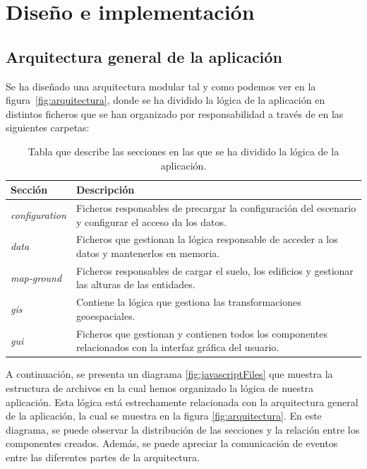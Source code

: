 \documentclass[a4paper, 11pt]{book}
\begin{document}

\clearpage
\chapter{Diseño e implementación}
\label{sec:diseno}
\section{Arquitectura general de la aplicación} 
\label{sec:arquitectura}
Se ha diseñado una arquitectura modular tal y como podemos ver en la figura~\ref{fig:arquitectura}, donde se ha dividido la lógica de la aplicación en distintos ficheros que se han organizado por responsabilidad a través de en las siguientes carpetas:
\begin{table}[H]
	\begin{center}
		\begin{tabular}{|l|p{13cm}|}
			\hline
			\textbf{Sección} & \textbf{Descripción} \\
			\hline
			\emph{configuration} & Ficheros responsables de precargar la configuración del escenario y configurar el acceso da los datos. \\\hline
			\emph{data} & Ficheros que gestionan la lógica responsable de acceder a los datos y mantenerlos en memoria. \\\hline
			\emph{map-ground} & Ficheros responsables de cargar el suelo, los edificios y gestionar las alturas de las entidades. \\\hline
			\emph{gis} & Contiene la lógica que gestiona las transformaciones geoespaciales. \\\hline
			\emph{gui} & Ficheros que gestionan y contienen todos los componentes relacionados con la interfaz gráfica del usuario.\\\hline
		\end{tabular}
		\caption{Tabla que describe las secciones en las que se ha dividido la lógica de la aplicación.}
	\end{center}
\end{table}
A continuación, se presenta un diagrama \ref{fig:javascriptFiles} que muestra la estructura de archivos en la cual hemos organizado la lógica de nuestra aplicación. 
Esta lógica está estrechamente relacionada con la arquitectura general de la aplicación, la cual se muestra en la figura \ref{fig:arquitectura}. En este diagrama, se puede observar la distribución de las secciones y la relación entre los componentes creados. Además, se puede apreciar la comunicación de eventos entre las diferentes partes de la arquitectura.
\end{document}
